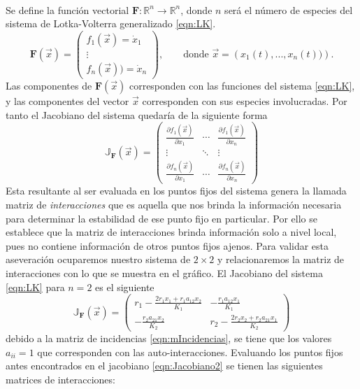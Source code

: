 \documentclass[11pt,a4paper]{article}
\begin{document}
\\
Se define la función vectorial $\mathbf{F}:\mathbb{R}^n\to\mathbb{R}^n$, donde $n$ será el número de especies del sistema de Lotka-Volterra generalizado \ref{eqn:LK}.
\begin{equation}\label{eqn:LKmatricial}
	\mathbf{F}(\vec{x})=\begin{pmatrix}
		f_1(\vec{x})=\dot{x}_1\\
		\vdots\\
		f_n(\vec{x}))=\dot{x}_n
	\end{pmatrix},\qquad\text{donde $\vec{x}=\left(x_1(t),...,x_n(t))\right)$.}
\end{equation}
Las componentes de $\mathbf{F}(\vec{x})$ corresponden con las funciones del sistema \ref{eqn:LK}, y las componentes del vector $\vec{x}$ corresponden con sus especies involucradas. Por tanto el Jacobiano del sistema quedaría de la siguiente forma
\begin{equation}\label{eqn:Jacobiano}
	\mathbb{J}_\mathbf{F}(\vec{x}) = \begin{pmatrix}
		\frac{\partial f_1(\vec{x})}{\partial x_1} & \cdots &\frac{\partial f_1(\vec{x})}{\partial x_n}\\
		\vdots & \ddots & \vdots\\
		\frac{\partial f_n(\vec{x})}{\partial x_1} & \cdots &\frac{\partial f_n(\vec{x})}{\partial x_n}
	\end{pmatrix}
\end{equation}
Esta resultante al ser evaluada en los puntos fijos del sistema genera la llamada matriz de \textit{interacciones} que es aquella que nos brinda la información necesaria para determinar la estabilidad de ese punto fijo en particular. Por ello se establece que la matriz de interacciones brinda información solo a nivel local, pues no contiene información de otros puntos fijos ajenos. Para validar esta aseveración ocuparemos nuestro sistema de $2\times 2$ y relacionaremos la matriz de interacciones con lo que se muestra en el gráfico. El Jacobiano del sistema \ref{eqn:LK} para $n=2$ es el siguiente
\begin{equation}\label{eqn:Jacobiano2}
	\mathbb{J}_\mathbf{F}(\vec{x})=\begin{pmatrix}
		r_1-\frac{2r_1x_1+r_1a_{12}x_2}{K_1} & -\frac{r_1a_{12}x_1}{K_1}\\
		-\frac{r_2a_{21}x_2}{K_2} & r_2-\frac{2r_2x_2+r_2a_{21}x_1}{K_2}
	\end{pmatrix}
\end{equation}
debido a la matriz de incidencias \ref{eqn:mIncidencias}, se tiene que los valores $a_{ii}=1$ que corresponden con las auto-interacciones. Evaluando los puntos fijos antes encontrados en el jacobiano \ref{eqn:Jacobiano2} se tienen las siguientes matrices de interacciones:
\end{document}
